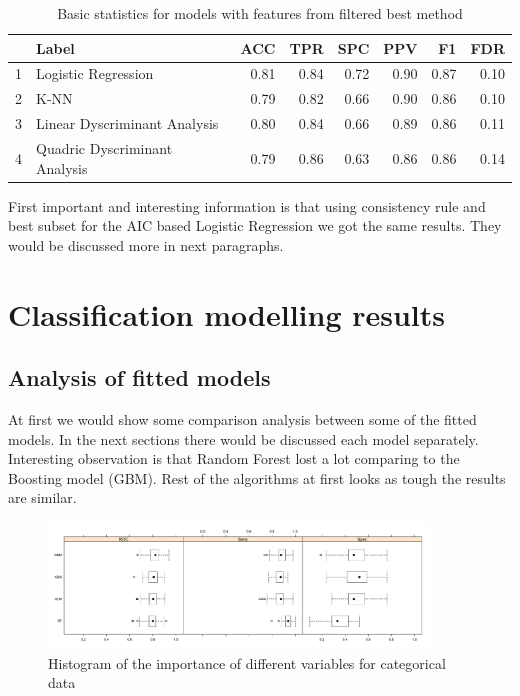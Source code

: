 \documentclass[10pt]{article}\usepackage[]{graphicx}\usepackage[]{color}
\begin{document}
\clearpage

\begin{table}[ht]
\centering
\begin{tabular}{rlrrrrrr}
\hline
& Label & ACC & TPR & SPC & PPV & F1 & FDR \\ 
\hline
1 & Logistic Regression & 0.81 & 0.84 & 0.72 & 0.90 & 0.87 & 0.10 \\ 
2 & K-NN & 0.79 & 0.82 & 0.66 & 0.90 & 0.86 & 0.10 \\ 
3 & Linear Dyscriminant Analysis & 0.80 & 0.84 & 0.66 & 0.89 & 0.86 & 0.11 \\ 
4 & Quadric Dyscriminant Analysis & 0.79 & 0.86 & 0.63 & 0.86 & 0.86 & 0.14 \\ 
\hline
\end{tabular}
\caption{Basic statistics for models with features from filtered best method} 
\end{table}

First important and interesting information is that using consistency rule and best subset for the AIC based Logistic Regression we got the same results. They would be discussed more in next paragraphs.




\section{Classification modelling results}
\subsection{Analysis of fitted models}


At first we would show some comparison analysis between some of the fitted models. In the next sections there would be discussed each model separately. 
Interesting observation is that Random Forest lost a lot comparing to the Boosting model (GBM). Rest of the algorithms at first looks as tough the results are similar. 

\begin{figure}[h!]
  \centering
  \includegraphics[width=0.9\textwidth]{Plots/STATS_MODEL_COMPARE}
  \caption[Close up of \textit{Hemidactylus} sp.]
   {Histogram of the importance of different variables for categorical data}
\end{figure}
\end{document}
